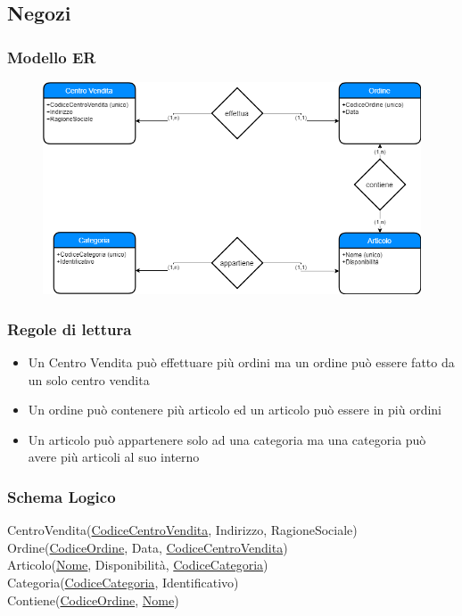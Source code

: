 \documentclass{article}
\begin{document}
	\pagebreak
	
	\subsection{Negozi}
	\subsubsection{Modello ER}
	\begin{figure}[h!]
		\centering
		\includegraphics[scale=0.5]{images/Negozio.png}
	\end{figure}
	\subsubsection{Regole di lettura}
	\begin{itemize}
		\item Un Centro Vendita può effettuare più ordini ma un ordine può essere fatto da un solo centro vendita
		\item Un ordine può contenere più articolo ed un articolo può essere in più ordini
		\item Un articolo può appartenere solo ad una categoria ma una categoria può avere più articoli al suo interno
	\end{itemize}
	\subsubsection{Schema Logico}
	CentroVendita(\underline{CodiceCentroVendita}, Indirizzo, RagioneSociale)\\
	Ordine(\underline{CodiceOrdine}, Data, \underline{CodiceCentroVendita})\\
	Articolo(\underline{Nome}, Disponibilità, \underline{CodiceCategoria})\\
	Categoria(\underline{CodiceCategoria}, Identificativo)\\
	Contiene(\underline{CodiceOrdine}, \underline{Nome})
\end{document}
